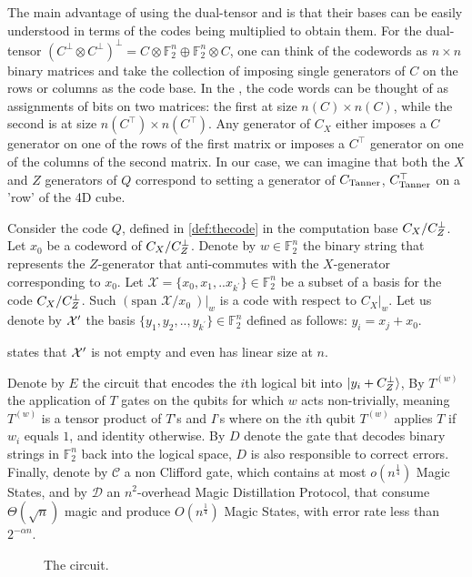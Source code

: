 The main advantage of using the dual-tensor and \Hyp is that their bases can be easily understood in terms of the codes being multiplied to obtain them. For the dual-tensor $(C^{\perp}\otimes C^{\perp})^{\perp} = C\otimes \mathbb{F}_{2}^{n} \oplus \mathbb{F}_{2}^{n} \otimes C$, one can think of the codewords as $n\times n$ binary matrices and take the collection of imposing single generators of $C$ on the rows or columns as the code base. In the \Hyp, the code words can be thought of as assignments of bits on two matrices: the first at size $n(C) \times n(C)$, while the second is at size $n(C^\top) \times n(C^\top)$. Any generator of $C_{X}$ either imposes a $C$ generator on one of the rows of the first matrix or imposes a $C^{\top}$ generator on one of the columns of the second matrix. In our case, we can imagine that both the $X$ and $Z$ generators of $Q$ correspond to setting a generator of $C_{\text{Tanner}}$, $C_{\text{Tanner}}^\top$ on a 'row' of the 4D cube.


\begin{definition}
  \label{def:subcode}  
Consider the code $Q$, defined in \cref{def:thecode} in the computation base $C_{X}/C_{Z}^\perp$. Let $x_{0}$ be a codeword of $C_{X}/C_{Z}^\perp$. Denote by $w \in \mathbb{F}_{2}^{n}$ the binary string that represents the $Z$-generator that anti-commutes with the $X$-generator corresponding to $x_{0}$. Let $\mathcal{X} = \{x_{0}, x_{1}, .. x_{k^\prime}\} \in \mathbb{F}_{2}^{n}$ be a subset of a basis for the code $C_{X}/C_{Z}^\perp$. Such $\left(\text{span } \mathcal{X}/x_0 \ \right)|_{w}$ is a \trig code with respect to $C_{X}|_{w}$. Let us denote by $\mathcal{X}^\prime$ the basis $\{ y_{1}, y_{2}, .., y_{k^\prime} \} \in \mathbb{F}_{2}^{n}$ defined as follows: $ y_{i} = x_{j} + x_{0}$.
\end{definition}

  states that $\mathcal{X}^\prime$ is not empty and even has linear size at $n$.


 \begin{definition}
   \label{def:gates} 
 Denote by $E$ the circuit that encodes the $i$th logical bit into $\ket{y_{i}+C_{Z}^{\perp}}$, By $T^{(w)}$ the application of $T$ gates on the qubits for which $w$ acts non-trivially, meaning $T^{(w)}$ is a tensor product of $T$'s and $I$'s where on the $i$th qubit $T^{(w)}$ applies $T$ if $w_{i}$ equals $1$, and identity otherwise. By $D$ denote the gate that decodes binary strings in $\mathbb{F}_{2}^{n}$ back into the logical space, $D$ is also responsible to correct errors.
 Finally, denote by $\mathcal{C}$ a non Clifford gate, which contains at most $o(n^{\frac{1}{4}})$ Magic States, and by $\mathcal{D}$ an $n^{2}$-overhead  Magic Distillation Protocol, that consume $\Theta(\sqrt{n})$ magic and produce $O(n^\frac{1}{4})$ Magic States, with error rate less than $2^{-\alpha n}$.     
 \end{definition}

\begin{figure}
  \label{fig:circ}
  \noindent %
  \scalebox{1.7}{ 
  
}
\caption{ The circuit.   }
\end{figure}

